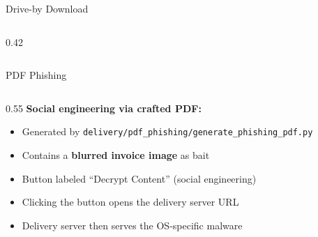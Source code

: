 \documentclass[aspectratio=169]{beamer}
\newcommand{\code}[1]{\texttt{\textcolor{primaryblue}{#1}}}
\begin{document}
\begin{frame}[fragile]{Drive-by Download}
\begin{columns}[T]
\begin{column}{0.42\textwidth}
    \end{column}
  \end{columns}
\end{frame}

\begin{frame}[fragile]{PDF Phishing}
  \begin{columns}[T]
    \begin{column}{0.55\textwidth}
      \textbf{Social engineering via crafted PDF:}

      \vspace{0.5em}
      \begin{itemize}
        \item Generated by \code{delivery/pdf\_phishing/generate\_phishing\_pdf.py}
        \item Contains a \textbf{blurred invoice image} as bait
        \item Button labeled ``Decrypt Content'' (social engineering)
        \item Clicking the button opens the delivery server URL
        \item Delivery server then serves the OS-specific malware
      \end{itemize}


\end{column}
\end{columns}
\end{frame}
\end{document}
